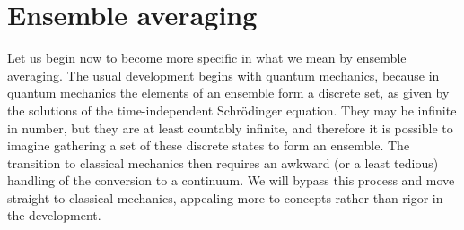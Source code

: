 \documentclass[9pt,bestpractices]{molsim}
\begin{document}
\section{Ensemble averaging}\label{ensemble-averaging}

Let us begin now to become more specific in what we mean by ensemble
averaging. The usual development begins with quantum mechanics, because
in quantum mechanics the elements of an ensemble form a discrete set, as
given by the solutions of the time-independent Schr{\"o}dinger equation.
They may be infinite in number, but they are at least countably
infinite, and therefore it is possible to imagine gathering a set of
these discrete states to form an ensemble. The transition to classical
mechanics then requires an awkward (or a least tedious) handling of the
conversion to a continuum. We will bypass this process and move straight
to classical mechanics, appealing more to concepts rather than rigor in
the development.
\end{document}
